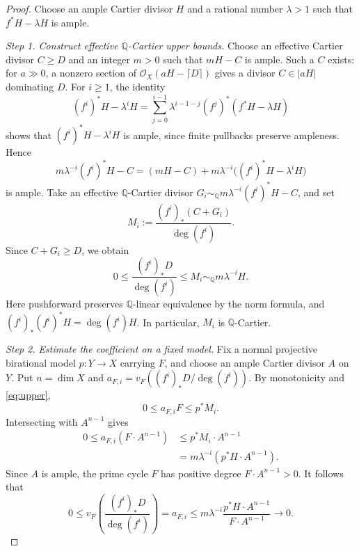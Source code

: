 \documentclass[11pt,a4paper]{article}
\newcommand{\Q}{\mathbb Q}
\newcommand{\OO}{\mathcal O}
\begin{document}
\begin{proof}
Choose an ample Cartier divisor $H$ and a rational number $\lambda>1$
such that $f^*H-\lambda H$ is ample.

\smallskip
\noindent\textit{Step 1. Construct effective $\Q$-Cartier upper bounds.}
Choose an effective Cartier divisor $C\ge D$ and an integer $m>0$
such that $mH-C$ is ample. Such a $C$ exists: for $a\gg0$, a nonzero
section of $\OO_X(aH-\lceil D\rceil)$ gives a divisor $C\in|aH|$
dominating $D$. For $i\ge1$, the identity
\[
 (f^i)^*H-\lambda^iH
 =\sum_{j=0}^{i-1}\lambda^{i-1-j}(f^j)^*(f^*H-\lambda H)
\]
shows that $(f^i)^*H-\lambda^iH$ is ample, since finite pullbacks
preserve ampleness. Hence
\[
 m\lambda^{-i}(f^i)^*H-C
 =(mH-C)+m\lambda^{-i}\bigl((f^i)^*H-\lambda^iH\bigr)
\]
is ample. Take an effective $\Q$-Cartier divisor
$G_i\sim_{\Q}m\lambda^{-i}(f^i)^*H-C$, and set
\[
 M_i:=\frac{(f^i)_*(C+G_i)}{\deg(f^i)}.
\]
Since $C+G_i\ge D$, we obtain
\begin{equation}\label{eq:upper}
 0\le \frac{(f^i)_*D}{\deg(f^i)}\le M_i\sim_{\Q}m\lambda^{-i}H.
\end{equation}
Here pushforward preserves $\Q$-linear equivalence by the norm formula,
and $(f^i)_*(f^i)^*H=\deg(f^i)H$. In particular, $M_i$ is
$\Q$-Cartier.

\smallskip
\noindent\textit{Step 2. Estimate the coefficient on a fixed model.}
Fix a normal projective birational model $p:Y\to X$ carrying $F$,
and choose an ample Cartier divisor $A$ on $Y$. Put $n=\dim X$ and
$a_{F,i}=v_F((f^i)_*D/\deg(f^i))$. By monotonicity and
\eqref{eq:upper},
\[
 0\le a_{F,i}F\le p^*M_i.
\]
Intersecting with $A^{n-1}$ gives
\[
 \begin{aligned}
 0\le a_{F,i}(F\cdot A^{n-1})
 &\le p^*M_i\cdot A^{n-1}\\
 &=m\lambda^{-i}(p^*H\cdot A^{n-1}).
 \end{aligned}
\]
Since $A$ is ample, the prime cycle $F$ has positive degree
$F\cdot A^{n-1}>0$. It follows that
\[
 0\le v_F\!\left(\frac{(f^i)_*D}{\deg(f^i)}\right)=a_{F,i}
 \le m\lambda^{-i}
 \frac{p^*H\cdot A^{n-1}}{F\cdot A^{n-1}}
 \longrightarrow0.
\]
\end{proof}
\end{document}

